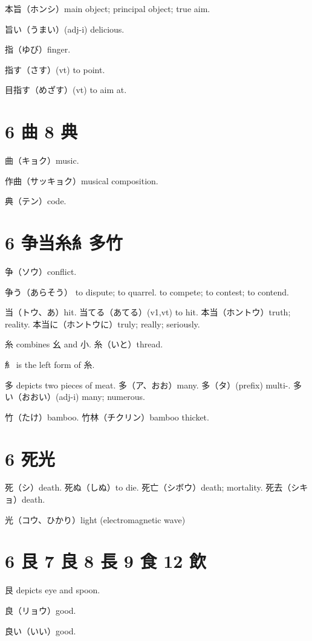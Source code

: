 本旨（ホンシ）main object; principal object; true aim.

旨い（うまい）(adj-i) delicious.

指（ゆび）finger.

指す（さす）(vt) to point.

目指す（めざす）(vt) to aim at.

\section{6 曲 8 典}

曲（キョク）music.

作曲（サッキョク）musical composition.

典（テン）code.

\section{6 争当糸糹多竹}

争（ソウ）conflict.

争う（あらそう）
to dispute; to quarrel.
to compete; to contest; to contend.

当（トウ、あ）hit.
当てる（あてる）(v1,vt) to hit.
本当（ホントウ）truth; reality.
本当に（ホントウに）truly; really; seriously.

糸 combines 幺 and 小.
糸（いと）thread.

糹 is the left form of 糸.

多 depicts two pieces of meat.
多（ア、おお）many.
多（タ）(prefix) multi-.
多い（おおい）(adj-i) many; numerous.

竹（たけ）bamboo.
竹林（チクリン）bamboo thicket.

\section{6 死光}

死（シ）death.
死ぬ（しぬ）to die.
死亡（シボウ）death; mortality.
死去（シキョ）death.

光（コウ、ひかり）light (electromagnetic wave)

\section{6 艮 7 良 8 長 9 食 12 飲}

艮 depicts eye and spoon.

良（リョウ）good.

良い（いい）good.

